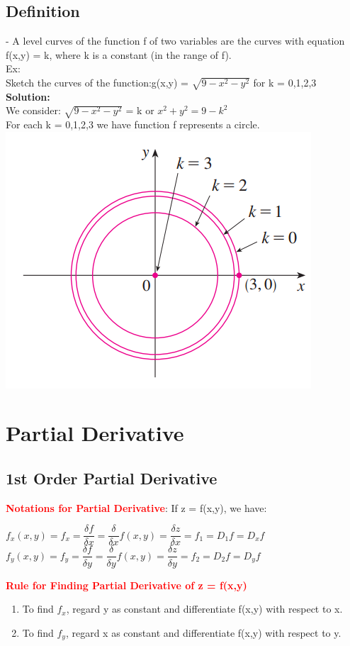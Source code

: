 \documentclass[12pt]{article}
\newcommand\textbfred[1]{\textcolor{red}{\textbf{#1}}}
\begin{document}
\subsection{Definition}
- A level curves of the function f of two variables are the curves with equation f(x,y) = k, where k is a constant (in the range of f). \\
Ex: \\
Sketch the curves of the function:g(x,y) = $\sqrt{9 - x^2 - y^2}$ for k = 0,1,2,3 \\
\textbf{Solution:} \\
We consider: $\sqrt{9 - x^2 - y^2}$ = k or $x^2 + y^2 = 9 - k^2$\\
For each k = 0,1,2,3 we have function f represents a circle. \\
\includegraphics[scale=1]{hinh1}
\section{Partial Derivative}
\subsection{1st Order Partial Derivative}
\textbfred{Notations for Partial Derivative}: If z = f(x,y), we have:
\pagebreak
\begin{mybox}
\begin{center}
$f_x(x,y) = f_{x} = \dfrac{\delta f}{\delta x} = \dfrac{\delta}{\delta x}f(x,y) = \dfrac{\delta z}{\delta x} = f_1 = D_1f = D_xf$ \\
$f_y(x,y) = f_{y} = \dfrac{\delta f}{\delta y} = \dfrac{\delta}{\delta y}f(x,y) = \dfrac{\delta z}{\delta y} = f_2 = D_2f = D_yf$ 
\end{center}
\end{mybox}
\bigbreak
\textbfred{Rule for Finding Partial Derivative of z = f(x,y)}
\begin{mybox}
\begin{center}
\begin{enumerate}
	\item To find $f_x$, regard y as constant and differentiate f(x,y) with respect to x.
	\item To find $f_y$, regard x as constant and differentiate f(x,y) with respect to y.
\end{enumerate}
\end{center}
\end{mybox}
\end{document}
